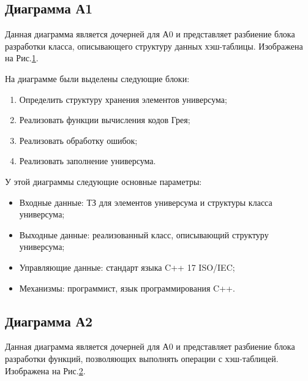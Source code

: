 \documentclass[a4paper, final]{article}
\begin{document}
\newpage
\subsection{Диаграмма А1}
\par Данная диаграмма является дочерней для А0 и представляет разбиение блока разработки класса, описывающего
структуру данных хэш-таблицы. Изображена на Рис.\ref{fig3:Диаграмма А1}. 

\begin{figure}[H]
	\centering
	
	\label{fig3:Диаграмма А1}
\end{figure}


\par На диаграмме были выделены следующие блоки:
\begin{enumerate}
\item Определить структуру хранения элементов универсума;
\item Реализовать функции вычисления кодов Грея;
\item Реализовать обработку ошибок;
\item Реализовать заполнение универсума.
\end{enumerate}
У этой диаграммы следующие основные параметры:
\begin{itemize}
\item Входные данные: ТЗ для элементов универсума и структуры класса универсума;
\item Выходные данные: реализованный класс, описывающий структуру универсума;
\item Управляющие данные: стандарт языка C++ 17 ISO/IEC;
\item Механизмы: программист, язык программирования C++.
\end{itemize}



\newpage
\subsection{Диаграмма А2}
\par Данная диаграмма является дочерней для А0 и представляет разбиение блока разработки функций, позволяющих выполнять операции с хэш-таблицей. Изображена на Рис.\ref{fig4:Диаграмма А2}. 

\begin{figure}[H]
	\centering
	
	\label{fig4:Диаграмма А2}
\end{figure}
\end{document}
